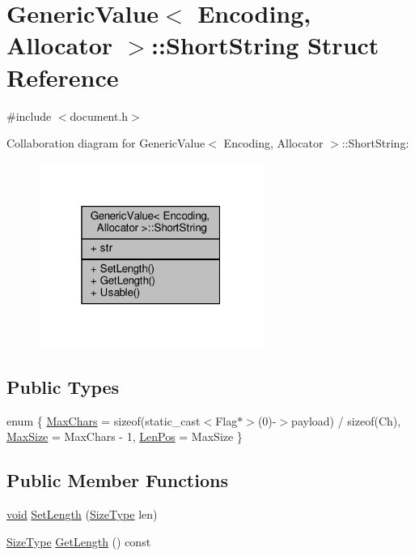 \hypertarget{structGenericValue_1_1ShortString}{}\section{Generic\+Value$<$ Encoding, Allocator $>$\+:\+:Short\+String Struct Reference}
\label{structGenericValue_1_1ShortString}


{\ttfamily \#include $<$document.\+h$>$}



Collaboration diagram for Generic\+Value$<$ Encoding, Allocator $>$\+:\+:Short\+String\+:
\nopagebreak
\begin{figure}[H]
\begin{center}
\leavevmode
\includegraphics[width=208pt]{structGenericValue_1_1ShortString__coll__graph}
\end{center}
\end{figure}
\subsection*{Public Types}
\begin{DoxyCompactItemize}
\item 
enum \{ \hyperlink{structGenericValue_1_1ShortString_a04dd81c10335aeb7163fde8fbf5fb383a6b29cffcea816906d271656a958bc0c7}{Max\+Chars} = sizeof(static\+\_\+cast$<$Flag$\ast$$>$(0)-\/$>$payload) / sizeof(Ch), 
\hyperlink{structGenericValue_1_1ShortString_a04dd81c10335aeb7163fde8fbf5fb383a991735d2e27155ccabe1c657653044ba}{Max\+Size} = Max\+Chars -\/ 1, 
\hyperlink{structGenericValue_1_1ShortString_a04dd81c10335aeb7163fde8fbf5fb383ac4ec681af40f3f6cfe7dcf6500637364}{Len\+Pos} = Max\+Size
 \}
\end{DoxyCompactItemize}
\subsection*{Public Member Functions}
\begin{DoxyCompactItemize}
\item 
\hyperlink{imgui__impl__opengl3__loader_8h_ac668e7cffd9e2e9cfee428b9b2f34fa7}{void} \hyperlink{structGenericValue_1_1ShortString_adbfe8461e0cb0ccb2cb3825489e743c2}{Set\+Length} (\hyperlink{rapidjson_8h_a5ed6e6e67250fadbd041127e6386dcb5}{Size\+Type} len)
\item 
\hyperlink{rapidjson_8h_a5ed6e6e67250fadbd041127e6386dcb5}{Size\+Type} \hyperlink{structGenericValue_1_1ShortString_a4aa295331ab0d019fd64f8f5d57d450b}{Get\+Length} () const
\end{DoxyCompactItemize}
